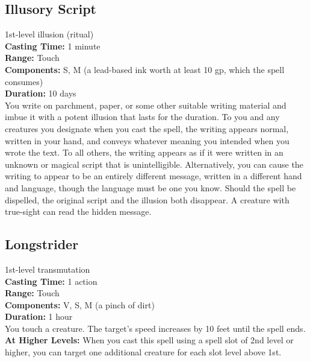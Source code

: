 \documentclass[11pt, A4paper, english]{article}
\begin{document}
		\subsection{Illusory Script}
1st-level illusion (ritual) \\
\textbf{Casting Time:} 1 minute \\
\textbf{Range:} Touch \\
\textbf{Components:} S, M (a lead-based ink worth at least 10 gp, which the spell consumes) \\
\textbf{Duration:} 10 days \\
You write on parchment, paper, or some other suitable writing material and imbue it with a potent illusion that lasts for the duration. To you and any creatures you designate when you cast the spell, the writing appears normal, written in your hand, and conveys whatever meaning you intended when you wrote the text. To all others, the writing appears as if it were written in an unknown or magical script that is unintelligible. Alternatively, you can cause the writing to appear to be an entirely different message, written in a different hand and language, though the language must be one you know. Should the spell be dispelled, the original script and the illusion both disappear. A creature with true-sight can read the hidden message.

		\subsection{Longstrider}
1st-level transmutation \\
\textbf{Casting Time:} 1 action \\
\textbf{Range:} Touch \\
\textbf{Components:} V, S, M (a pinch of dirt) \\
\textbf{Duration:} 1 hour \\
You touch a creature. The target’s speed increases by 10 feet until the spell ends. \\
\textbf{At Higher Levels:} When you cast this spell using a spell slot of 2nd level or higher, you can target one additional creature for each slot level above 1st.
\end{document}
